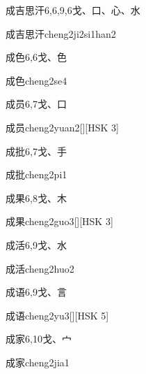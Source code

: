 \begin{entry}{成吉思汗}{6,6,9,6}{⼽、⼝、⼼、⽔}
  \begin{phonetics}{成吉思汗}{cheng2ji2si1han2}
  \end{phonetics}
\end{entry}

\begin{entry}{成色}{6,6}{⼽、⾊}
  \begin{phonetics}{成色}{cheng2se4}
  \end{phonetics}
\end{entry}

\begin{entry}{成员}{6,7}{⼽、⼝}
  \begin{phonetics}{成员}{cheng2yuan2}[][HSK 3]
  \end{phonetics}
\end{entry}

\begin{entry}{成批}{6,7}{⼽、⼿}
  \begin{phonetics}{成批}{cheng2pi1}
  \end{phonetics}
\end{entry}

\begin{entry}{成果}{6,8}{⼽、⽊}
  \begin{phonetics}{成果}{cheng2guo3}[][HSK 3]
  \end{phonetics}
\end{entry}

\begin{entry}{成活}{6,9}{⼽、⽔}
  \begin{phonetics}{成活}{cheng2huo2}
  \end{phonetics}
\end{entry}

\begin{entry}{成语}{6,9}{⼽、⾔}
  \begin{phonetics}{成语}{cheng2yu3}[][HSK 5]
  \end{phonetics}
\end{entry}

\begin{entry}{成家}{6,10}{⼽、⼧}
  \begin{phonetics}{成家}{cheng2jia1}
  \end{phonetics}
\end{entry}

